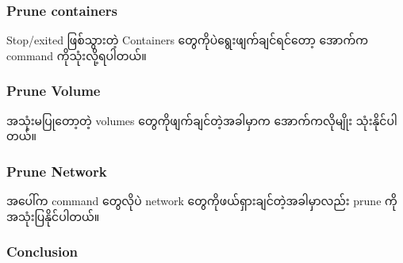 \begin{Shaded}
\begin{Highlighting}[]
\NormalTok{$ }
\end{Highlighting}
\end{Shaded}

\hypertarget{prune-containers-1}{%
\subsubsection{Prune containers}\label{prune-containers-1}}

Stop/exited ဖြစ်သွားတဲ့ Containers တွေကိုပဲရွေးဖျက်ချင်ရင်တော့ အောက်က
command ကိုသုံးလို့ရပါတယ်။

\begin{Shaded}
\begin{Highlighting}[]
\NormalTok{$ }
\end{Highlighting}
\end{Shaded}

\hypertarget{prune-volume-1}{%
\subsubsection{Prune Volume}\label{prune-volume-1}}

အသုံးမပြုတော့တဲ့ volumes တွေကိုဖျက်ချင်တဲ့အခါမှာက အောက်ကလိုမျိုး
သုံးနိုင်ပါတယ်။

\begin{Shaded}
\begin{Highlighting}[]
\NormalTok{$ }
\end{Highlighting}
\end{Shaded}

\hypertarget{prune-network-1}{%
\subsubsection{Prune Network}\label{prune-network-1}}

အပေါ်က command တွေလိုပဲ network တွေကိုဖယ်ရှားချင်တဲ့အခါမှာလည်း prune
ကိုအသုံးပြနိုင်ပါတယ်။

\begin{Shaded}
\begin{Highlighting}[]
\NormalTok{$ }
\end{Highlighting}
\end{Shaded}

\hypertarget{conclusion-1}{%
\subsubsection{Conclusion}\label{conclusion-1}}

